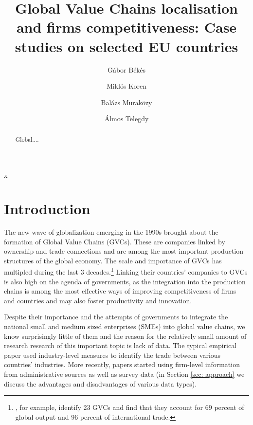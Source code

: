 x\documentclass[final, dvipsnames, authoryear,12pt]{elsarticle}
\begin{document}
\begin{frontmatter}
\title{Global Value Chains localisation and firms competitiveness: Case studies on selected EU countries}






\author[gb]{G\'{a}bor B\'{e}k\'{e}s}
\author[mk]{Miklós Koren}
\author[bm]{Balázs Muraközy}
\author[at]{Álmos Telegdy}
 \address[gb]{Central European University, Institute of Economics and CEPR}
 \address[mk]{Central European University, Institute of Economics and CEPR}
 \address[bm]{University of Liverpool, Institute of Economics }
 \address[at]{National Bank of Hungary}
 
 




\begin{abstract}
    Global....
\end{abstract}


\end{frontmatter}

\section{Introduction}

The new wave of globalization emerging in the 1990s brought about the formation of Global Value Chains (GVCs). These are companies linked by ownership and trade connections and are among the most important production structures of the global economy. The scale and importance of GVCs has multipled during the last 3 decades.\footnote{\cite{mckinsey2019gvc}, for example, identify 23 GVCs and find that they account for 69 percent of global output and 96 percent of international trade.} Linking their countries' companies to GVCs is also high on the agenda of governments, as the integration into the production chains is among the most effective ways of improving competitiveness of firms and countries and may also foster productivity and innovation.

Despite their importance and the attempts of governments to integrate the national small and medium sized enterprises (SMEs) into global value chains, we know surprisingly little of them and the reason for the relatively small amount of research research of this important topic is lack of data. The typical empirical paper used industry-level measures to identify the trade between various countries' industries. More recently, papers started using firm-level information from administrative sources as well as survey data (in Section \ref{sec: approach} we discuss the advantages and disadvantages of various data types).
\end{document}
